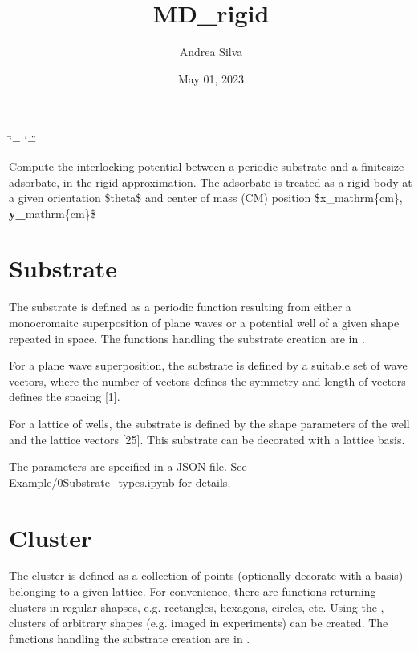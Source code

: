 \documentclass[letterpaper,10pt,english]{sphinxmanual}
\title{MD\_rigid}
\date{May 01, 2023}
\author{Andrea Silva}
\begin{document}
\ifdefined\shorthandoff
  \ifnum\catcode`\=\string=\active\shorthandoff{=}\fi
  \ifnum\catcode`\"=\active{}\fi
\fi

\pagestyle{empty}
\sphinxmaketitle
\pagestyle{plain}
\sphinxtableofcontents
\pagestyle{normal}
\label{\detokenize{index::doc}}




\sphinxAtStartPar
Compute the interlocking potential between a periodic substrate and a finite\sphinxhyphen{}size adsorbate, in the rigid approximation.
The adsorbate is treated as a rigid body at a given orientation \$theta\$ and center of mass (CM) position \$x\_mathrm\{cm\}, {\color{red}\bfseries{}y\_}mathrm\{cm\}\$


\chapter{Substrate}
\label{\detokenize{index:substrate}}
\sphinxAtStartPar
The substrate is defined as a periodic function resulting from either a monocromaitc superposition of plane waves or a potential well of a given shape repeated in space.
The functions handling the substrate creation are in .

\sphinxAtStartPar
For a plane wave superposition, the substrate is defined by a suitable set of wave vectors, where the number of vectors defines the symmetry and length of vectors defines the spacing {[}1{]}.

\sphinxAtStartPar
For a lattice of wells, the substrate is defined by the shape parameters of the well and the lattice vectors {[}2\sphinxhyphen{}5{]}. This substrate can be decorated with a lattice basis.

\sphinxAtStartPar
The parameters are specified in a JSON file.
See Example/0\sphinxhyphen{}Substrate\_types.ipynb for details.


\chapter{Cluster}
\label{\detokenize{index:cluster}}
\sphinxAtStartPar
The cluster is defined as a collection of points (optionally decorate with a basis) belonging to a given lattice.
For convenience, there are functions returning clusters in regular shapses, e.g. rectangles, hexagons, circles, etc.
Using the , clusters of arbitrary shapes (e.g. imaged in experiments) can be created.
The functions handling the substrate creation are in .
\end{document}
